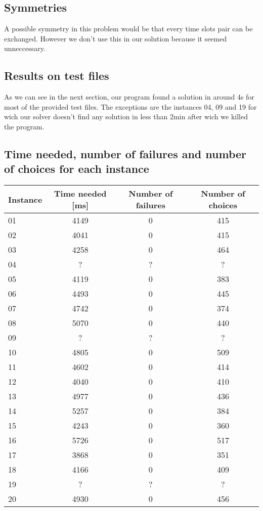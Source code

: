\documentclass{eplDoc}
\begin{document}
\subsection{Symmetries}

A possible symmetry in this problem would be that every time slots pair can be exchanged. However we don't use this in our solution because it seemed unneccessary. 

\subsection{Results on test files}

As we can see in the next section, our program found a solution in around 4s for most of the provided test files. The exceptions are the instances 04, 09 and 19 for wich our solver doesn't find any solution in less than 2min after wich we killed the program. \\ 


\subsection{Time needed, number of failures and number of choices for each instance}
\begin{center}
		\begin{tabular}{|l|c|c|c|}
			\hline
			Instance & Time needed [ms] & Number of failures & Number of choices \\ 
			\hline
			01 & 4149 & 0 & 415 \\ 
			02 & 4041 & 0 & 415 \\ 
			03 & 4258 & 0 & 464 \\ 
			04 & ? & ? & ? \\ 
			05 & 4119 & 0 & 383 \\ 
			06 & 4493 & 0 & 445 \\ 
			07 & 4742 & 0 & 374 \\ 
			08 & 5070 & 0 & 440 \\ 
			09 & ? & ? & ? \\ 
			10 & 4805 & 0 & 509 \\ 
			11 & 4602 & 0 & 414 \\ 
			12 & 4040 & 0 & 410 \\ 
			13 & 4977 & 0 & 436 \\ 
			14 & 5257 & 0 & 384 \\ 
			15 & 4243 & 0 & 360 \\ 
			16 & 5726 & 0 & 517 \\ 
			17 & 3868 & 0 & 351 \\ 
			18 & 4166 & 0 & 409 \\ 
			19 & ? & ? & ? \\ 
			20 & 4930 & 0 & 456 \\
			\hline
		\end{tabular}
\end{center}
\end{document}
